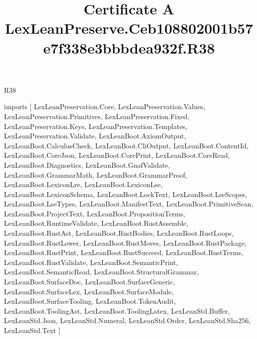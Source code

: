 \begin{lexlean}{R38}
\title{Certificate A LexLeanPreserve.Ceb108802001b57e7f338e3bbbdea932f.R38}
\begin{coremodule}
imports [
  LexLeanPreservation.Core,
  LexLeanPreservation.Values,
  LexLeanPreservation.Primitives,
  LexLeanPreservation.Fixed,
  LexLeanPreservation.Keys,
  LexLeanPreservation.Templates,
  LexLeanPreservation.Validate,
  LexLeanBoot.AxiomOutput,
  LexLeanBoot.CalculusCheck,
  LexLeanBoot.CliOutput,
  LexLeanBoot.ContentId,
  LexLeanBoot.CoreJson,
  LexLeanBoot.CorePrint,
  LexLeanBoot.CoreRead,
  LexLeanBoot.Diagnostics,
  LexLeanBoot.GnafValidate,
  LexLeanBoot.GrammarMath,
  LexLeanBoot.GrammarProof,
  LexLeanBoot.LexiconLre,
  LexLeanBoot.LexiconLse,
  LexLeanBoot.LexiconSchema,
  LexLeanBoot.LockText,
  LexLeanBoot.LseScopes,
  LexLeanBoot.LseTypes,
  LexLeanBoot.ManifestText,
  LexLeanBoot.PrimitiveScan,
  LexLeanBoot.ProjectText,
  LexLeanBoot.PropositionTerms,
  LexLeanBoot.RuntimeValidate,
  LexLeanBoot.RustAssemble,
  LexLeanBoot.RustAst,
  LexLeanBoot.RustBodies,
  LexLeanBoot.RustLoops,
  LexLeanBoot.RustLower,
  LexLeanBoot.RustMoves,
  LexLeanBoot.RustPackage,
  LexLeanBoot.RustPrint,
  LexLeanBoot.RustSucceed,
  LexLeanBoot.RustTerms,
  LexLeanBoot.RustValidate,
  LexLeanBoot.SemanticPrint,
  LexLeanBoot.SemanticRead,
  LexLeanBoot.StructuralGrammar,
  LexLeanBoot.SurfaceDoc,
  LexLeanBoot.SurfaceGeneric,
  LexLeanBoot.SurfaceLex,
  LexLeanBoot.SurfaceModule,
  LexLeanBoot.SurfaceTooling,
  LexLeanBoot.TokenAudit,
  LexLeanBoot.ToolingAst,
  LexLeanBoot.ToolingLatex,
  LexLeanStd.Buffer,
  LexLeanStd.Json,
  LexLeanStd.Numeral,
  LexLeanStd.Order,
  LexLeanStd.Sha256,
  LexLeanStd.Text
]


\end{coremodule}
\end{lexlean}
